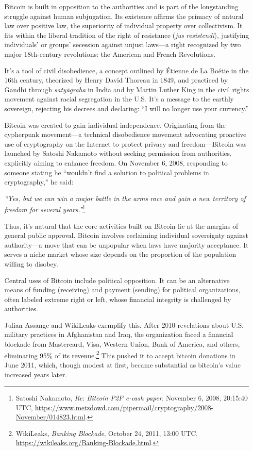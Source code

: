 \documentclass[
  a5paper,
  smalldemyvopaper,10pt,twoside,onecolumn,openright,extrafontsizes,hidelinks]{memoir}
\begin{document}
Bitcoin is built in opposition to the authorities and is part of the
longstanding struggle against human subjugation. Its existence affirms
the primacy of natural law over positive law, the superiority of
individual property over collectivism. It fits within the liberal
tradition of the right of resistance (\emph{jus resistendi}), justifying
individuals' or groups' secession against unjust laws---a right
recognized by two major 18th-century revolutions: the American and
French Revolutions.

It's a tool of civil disobedience, a concept outlined by Étienne de La
Boétie in the 16th century, theorized by Henry David Thoreau in 1849,
and practiced by Gandhi through \emph{satyāgraha} in India and by Martin
Luther King in the civil rights movement against racial segregation in
the U.S. It's a message to the earthly sovereign, rejecting his decrees
and declaring: ``I will no longer use your currency.''

Bitcoin was created to gain individual independence. Originating from
the cypherpunk movement---a technical disobedience movement advocating
proactive use of cryptography on the Internet to protect privacy and
freedom---Bitcoin was launched by Satoshi Nakamoto without seeking
permission from authorities, explicitly aiming to enhance freedom. On
November 6, 2008, responding to someone stating he ``wouldn't find a
solution to political problems in cryptography,'' he said:

\emph{``Yes, but we can win a major battle in the arms race and gain a
new territory of freedom for several years.''}\footnote{Satoshi
  Nakamoto, \emph{Re: Bitcoin P2P e-cash paper}, November 6, 2008,
  20:15:40 UTC,
  \url{https://www.metzdowd.com/pipermail/cryptography/2008-November/014823.html}.}

Thus, it's natural that the core activities built on Bitcoin lie at the
margins of general public approval. Bitcoin involves reclaiming
individual sovereignty against authority---a move that can be unpopular
when laws have majority acceptance. It serves a niche market whose size
depends on the proportion of the population willing to disobey.

Central uses of Bitcoin include political opposition. It can be an
alternative means of funding (receiving) and payment (sending) for
political organizations, often labeled extreme right or left, whose
financial integrity is challenged by authorities.

Julian Assange and WikiLeaks exemplify this. After 2010 revelations
about U.S. military practices in Afghanistan and Iraq, the organization
faced a financial blockade from Mastercard, Visa, Western Union, Bank of
America, and others, eliminating 95\% of its revenue.\footnote{WikiLeaks,
  \emph{Banking Blockade}, October 24, 2011, 13:00 UTC,
  \url{https://wikileaks.org/Banking-Blockade.html}.} This pushed it to
accept bitcoin donations in June 2011, which, though modest at first,
became substantial as bitcoin's value increased years later.
\end{document}
